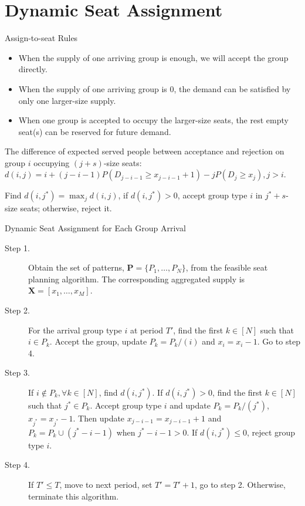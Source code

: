 
\section{Dynamic Seat Assignment}
    \frame{\sectionpage}

    \begin{frame}{Assign-to-seat Rules}
        \begin{itemize}
          \item When the supply of one arriving group is enough, we will accept the group directly.
          \item When the supply of one arriving group is 0, the demand can be satisfied by only one larger-size supply.
          \item When one group is accepted to occupy the larger-size seats, the rest empty seat(s) can be reserved for future demand.
      \end{itemize}
      The difference of expected served people between acceptance and rejection on group $i$ occupying $(j+s)$-size seats: $d(i,j) = i + (j-i-1)P(D_{j-i-1} \geq x_{j-i-1}+1) - j P(D_{j} \geq x_{j}), j >i$.

      Find $d(i,j^{*}) = \max_{j} d(i,j)$, if $d(i,j^{*}) > 0$, accept group type $i$ in $j^{*}+s$-size seats; otherwise, reject it.
      \end{frame}

    \begin{frame}{Dynamic Seat Assignment for Each Group Arrival}
        \begin{description}
          \item[Step 1.] Obtain the set of patterns, $\mathbf{P} = \{P_1,\ldots,P_{N}\}$, from the feasible seat planning algorithm. The corresponding aggregated supply is $\mathbf{X} = [x_{1}, \ldots, x_{M}]$.
          \item[Step 2.] For the arrival group type $i$ at period $T{'}$, find the first $k \in [N]$ such that $i \in P_k$. Accept the group, update $P_{k} = P_{k}/(i)$ and $x_{i} = x_{i} -1$. Go to step 4.
          \item[Step 3.] If $i \notin P_k, \forall k \in [N]$, find $d(i,j^{*})$. If $d(i,j^{*})>0$, find the first $k \in [N]$ such that $j^{*} \in P_k$. Accept group type $i$ and update $P_{k} = P_{k}/(j^{*})$, $x_{j^{*}} = x_{j^{*}} -1$. Then update $x_{j-i-1} = x_{j-i-1} + 1$ and $P_{k}= P_{k} \cup (j^{*}-i-1)$ when $j^{*}-i-1 > 0$. If $d(i,j^{*}) \leq 0$, reject group type $i$.
          \item[Step 4.] If $T{'} \leq T$, move to next period, set $T{'} = T{'}+1$, go to step 2. Otherwise, terminate this algorithm.
        \end{description}
      \end{frame}
      
